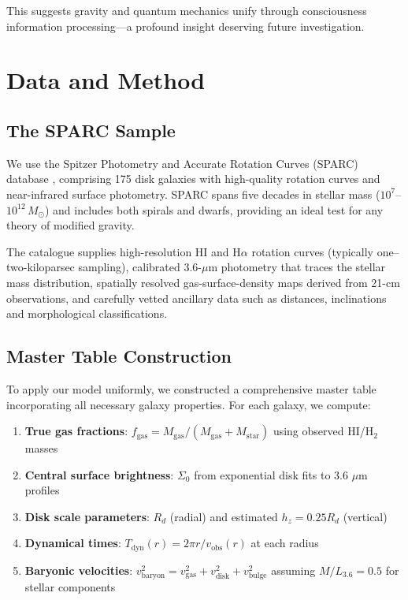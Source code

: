 \documentclass[twocolumn,prd,amsmath,amssymb,aps,superscriptaddress,nofootinbib]{revtex4-2}
\newcommand{\Msun}{M_{\odot}}
\begin{document}
This suggests gravity and quantum mechanics unify through consciousness information processing---a profound insight deserving future investigation.

\section{Data and Method}
\label{sec:data}

\subsection{The SPARC Sample}

We use the Spitzer Photometry and Accurate Rotation Curves (SPARC) database \cite{Lelli2016}, comprising 175 disk galaxies with high-quality rotation curves and near-infrared surface photometry. SPARC spans five decades in stellar mass ($10^7$--$10^{12}\,\Msun$) and includes both spirals and dwarfs, providing an ideal test for any theory of modified gravity.

The catalogue supplies high-resolution HI and H$\alpha$ rotation curves (typically one–two-kiloparsec sampling), calibrated 3.6-$\mu$m photometry that traces the stellar mass distribution, spatially resolved gas-surface-density maps derived from 21-cm observations, and carefully vetted ancillary data such as distances, inclinations and morphological classifications.

\subsection{Master Table Construction}

To apply our model uniformly, we constructed a comprehensive master table incorporating all necessary galaxy properties. For each galaxy, we compute:

\begin{enumerate}
\item \textbf{True gas fractions}: $f_{\text{gas}} = M_{\text{gas}}/(M_{\text{gas}} + M_{\text{star}})$ using observed HI/H$_2$ masses
\item \textbf{Central surface brightness}: $\Sigma_0$ from exponential disk fits to 3.6 $\mu$m profiles
\item \textbf{Disk scale parameters}: $R_d$ (radial) and estimated $h_z = 0.25 R_d$ (vertical)
\item \textbf{Dynamical times}: $T_{\text{dyn}}(r) = 2\pi r/v_{\text{obs}}(r)$ at each radius
\item \textbf{Baryonic velocities}: $v_{\text{baryon}}^2 = v_{\text{gas}}^2 + v_{\text{disk}}^2 + v_{\text{bulge}}^2$ assuming $M/L_{3.6} = 0.5$ for stellar components
\end{enumerate}
\end{document}
